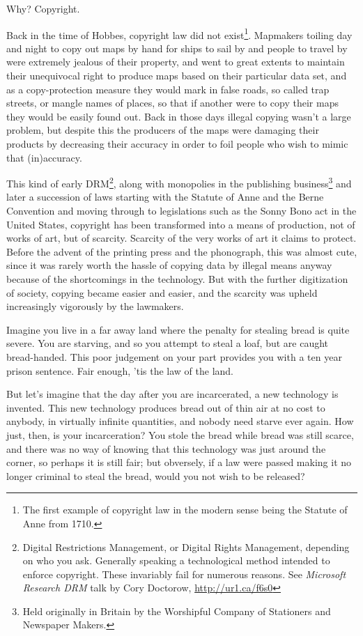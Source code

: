 Why? Copyright.

Back in the time of Hobbes, copyright law did not exist\footnote{The
f\hbox{}irst example of copyright law in the modern sense being the Statute of
Anne from 1710.}. Mapmakers toiling day and night to copy out maps by hand for
ships to sail by and people to travel by were extremely jealous of their
property, and went to great extents to maintain their unequivocal right to
produce maps based on their particular data set, and as a copy-protection
measure they would mark in false roads, so called trap streets, or mangle names
of places, so that if another were to copy their maps they would be easily 
found out. Back in those days illegal copying wasn't a large problem, but
despite this the producers of the maps were damaging their products by
decreasing their accuracy in order to foil people who wish to mimic that
(in)accuracy.

This kind of early DRM\footnote{Digital Restrictions Management, or Digital
Rights Management, depending on who you ask. Generally speaking a technological
method intended to enforce copyright. These invariably fail for numerous
reasons. See \textit{Microsoft Research DRM} talk by Cory Doctorow,
\url{http://ur1.ca/f6s0}}, along with monopolies in the publishing
business\footnote{Held originally in Britain by the Worshipful Company of
Stationers and Newspaper Makers.} and later a succession of laws starting with
the Statute of Anne and the Berne Convention and moving through to legislations
such as the Sonny Bono act in the United States, copyright has been transformed
into a means of production, not of works of art, but of scarcity. Scarcity of
the very works of art it claims to protect. Before the advent of the printing
press and the phonograph, this was almost cute, since it was rarely worth the
hassle of copying data by illegal means anyway because of the shortcomings in
the technology. But with the further digitization of society, copying became
easier and easier, and the scarcity was upheld increasingly vigorously by the
lawmakers.

Imagine you live in a far away land where the penalty for stealing bread is
quite severe. You are starving, and so you attempt to steal a loaf, but are
caught bread-handed. This poor judgement on your part provides you with a ten
year prison sentence. Fair enough, 'tis the law of the land. 

But let's imagine that the day after you are incarcerated, a new technology is
invented. This new technology produces bread out of thin air at no cost to
anybody, in virtually inf\hbox{}inite quantities, and nobody need starve ever
again.  How just, then, is your incarceration? You stole the bread while bread
was still scarce, and there was no way of knowing that this technology was just
around the corner, so perhaps it is still fair; but obversely, if a law were
passed making it no longer criminal to steal the bread, would you not wish to 
be released?

